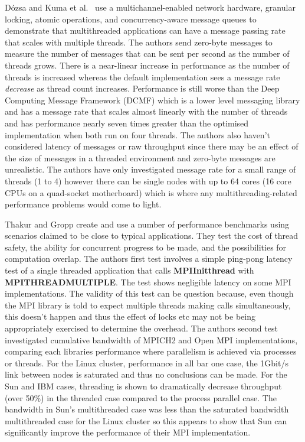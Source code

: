 \documentclass{acm_proc_article-sp}
\renewcommand{\_}{\underscore\hspace{0pt}}
\begin{document}
D\'{o}zsa and Kuma et al.\ \cite{Kumar} use a multichannel-enabled network
hardware, granular locking, atomic operations, and concurrency-aware message
queues to demonstrate that multithreaded applications can have a message passing
rate that scales with multiple threads. The authors send zero-byte messages to
measure the number of messages that can be sent per second as the number of
threads grows. There is a near-linear increase in performance as the number of
threads is increased whereas the default implementation sees a message rate
\textit{decrease} as thread count increases. Performance is still worse than the
Deep Computing Message Framework (DCMF) which is a lower level messaging library
and has a message rate that scales almost linearly with the number of threads
and has performance nearly seven times greater than the optimised implementation
when both run on four threads. The authors also haven't considered latency of
messages or raw throughput since there may be an effect of the size of messages
in a threaded environment and zero-byte messages are unrealistic. The authors
have only investigated message rate for a small range of threads (1 to 4)
however there can be single nodes with up to 64 cores (16 core CPUs on a
quad-socket motherboard) which is where any multithreading-related performance
problems would come to light.

Thakur and Gropp \cite{Thakur2009} create and use a number of performance
benchmarks using scenarios claimed to be close to typical applications. They
test the cost of thread safety, the ability for concurrent progress to be made,
and the possibilities for computation overlap. The authors first test involves a
simple ping-pong latency test of a single threaded application that calls
\textbf{MPI\_Init\_thread} with \textbf{MPI\_THREAD\_MULTIPLE}. The test shows
negligible latency on some MPI implementations. The validity of this test can be
question because, even though the MPI library is told to expect multiple threads
making calls simultaneously, this doesn't happen and thus the effect of locks
etc may not be being appropriately exercised to determine the overhead. The
authors second test investigated cumulative bandwidth of MPICH2 and Open MPI
implementations, comparing each libraries performance where parallelism is
achieved via processes or threads. For the Linux cluster, performance in all bar
one case, the 1Gbit/s link between nodes is saturated and thus no conclusions
can be made. For the Sun and IBM cases, threading is shown to dramatically
decrease throughput (over 50\%) in the threaded case compared to the process
parallel case. The bandwidth in Sun's multithreaded case was less than the
saturated bandwidth multithreaded case for the Linux cluster so this appears to
show that Sun can significantly improve the performance of their MPI
implementation.
\end{document}
